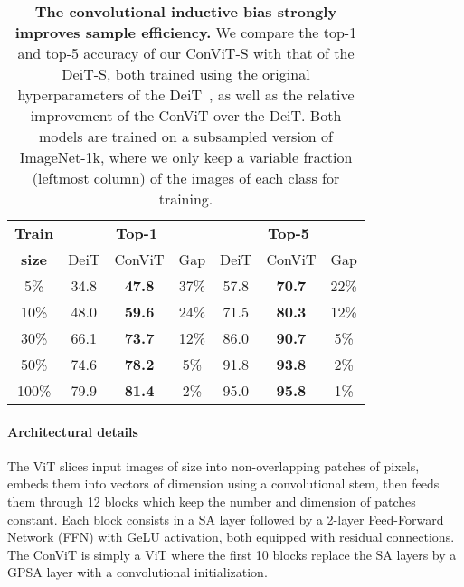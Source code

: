 \documentclass[a4paper,11pt,twocolumn]{article}
\begin{document}
\begin{table}[tb]
    \footnotesize
    \centering
    \begin{tabular}{c|c|c|c|c|c|c}
    \toprule
    \textbf{Train} & \multicolumn{3}{c|}{\textbf{Top-1}} & \multicolumn{3}{c}{\textbf{Top-5}}\\
    \textbf{size} & DeiT & ConViT & Gap & DeiT & ConViT & Gap\\
    \midrule
    5\% & 34.8 & \textbf{47.8} & 37\% & 57.8 & \textbf{70.7} & 22\%\\
    10\% & 48.0 & \textbf{59.6} & 24\% & 71.5 & \textbf{80.3} & 12\%\\
    30\% & 66.1 & \textbf{73.7} & 12\% & 86.0 & \textbf{90.7} & 5\%\\
    50\% & 74.6 & \textbf{78.2} & 5\% & 91.8 & \textbf{93.8} & 2\%\\
    100\%& 79.9 & \textbf{81.4} & 2\% & 95.0 & \textbf{95.8} & 1\%\\
\bottomrule
    \end{tabular}
    \caption{\textbf{The convolutional inductive bias strongly improves sample efficiency.} We compare the top-1 and top-5 accuracy of our ConViT-S with that of the DeiT-S, both trained using the original hyperparameters of the DeiT~\cite{touvron2020training}, as well as the relative improvement of the ConViT over the DeiT.  Both models are trained on a subsampled version of ImageNet-1k, where we only keep a variable fraction (leftmost column) of the images of each class for training.}
    \label{tab:sample-efficiency}
\end{table}





\paragraph{Architectural details}

The ViT slices input images of size  into  non-overlapping patches of  pixels, embeds them into vectors of dimension  using a convolutional stem, then feeds them through 12 blocks which keep the number and dimension of patches constant. Each block consists in a SA layer followed by a 2-layer Feed-Forward Network (FFN) with GeLU activation, both equipped with residual connections. The ConViT is simply a ViT where the first 10 blocks replace the SA layers by a GPSA layer with a convolutional initialization. 
\end{document}
